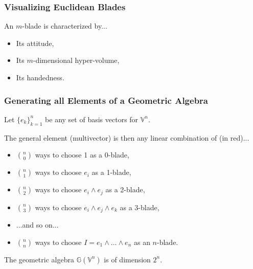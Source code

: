 \documentclass{beamer}
\newcommand{\G}{\mathbb{G}}
\newcommand{\V}{\mathbb{V}}
\begin{document}
\begin{frame}
\frametitle{Visualizing Euclidean Blades}
An $m$-blade is characterized by...\pause
\begin{itemize}
\item Its \alert{attitude},\pause
\item Its $m$-dimensional \alert{hyper-volume},\pause
\item Its \alert{handedness}.
\end{itemize}
\end{frame}

\begin{frame}
\frametitle{Generating all Elements of a Geometric Algebra}
Let $\{e_k\}_{k=1}^n$ be any set of basis vectors for $\V^n$.\pause

The general element (multivector) is then any linear combination of (\alert{in red})...\pause
\begin{itemize}
\item $\binom{n}{0}$ ways to choose \alert{1} as a 0-blade,\pause
\item $\binom{n}{1}$ ways to choose \alert{$e_i$} as a 1-blade,\pause
\item $\binom{n}{2}$ ways to choose \alert{$e_i\wedge e_j$} as a 2-blade,\pause
\item $\binom{n}{3}$ ways to choose \alert{$e_i\wedge e_j\wedge e_k$} as a 3-blade,\pause
\item ...and so on...\pause
\item $\binom{n}{n}$ ways to choose \alert{$I=e_1\wedge\dots\wedge e_n$} as an $n$-blade.\pause
\end{itemize}
The geometric algebra $\G(\V^n)$ is of dimension $2^n$.
\end{frame}
\end{document}
